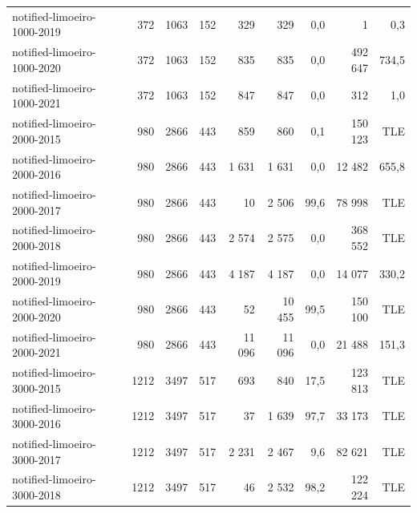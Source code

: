 \documentclass[a4paper,11pt]{article}
\begin{document}
\begin{table}[!ht]
{\begin{tabular}{lrrrrrrrr}
notified-limoeiro-1000-2019   & 372  & 1063 & 152 & 329    & 329    & 0,0  & 1       & 0,3                         \\
\rowcolor[HTML]{9B9B9B} 
notified-limoeiro-1000-2020   & 372  & 1063 & 152 & 835    & 835    & 0,0  & 492 647 & 734,5                       \\
\rowcolor[HTML]{9B9B9B} 
notified-limoeiro-1000-2021   & 372  & 1063 & 152 & 847    & 847    & 0,0  & 312     & 1,0                         \\ \hline
\rowcolor[HTML]{C0C0C0} 
notified-limoeiro-2000-2015   & 980  & 2866 & 443 & 859    & 860    & 0,1  & 150 123 & TLE                         \\
\rowcolor[HTML]{9B9B9B} 
notified-limoeiro-2000-2016   & 980  & 2866 & 443 & 1 631  & 1 631  & 0,0  & 12 482  & 655,8                       \\
\rowcolor[HTML]{C0C0C0} 
notified-limoeiro-2000-2017   & 980  & 2866 & 443 & 10     & 2 506  & 99,6 & 78 998  & \cellcolor[HTML]{C0C0C0}TLE \\
\rowcolor[HTML]{C0C0C0} 
notified-limoeiro-2000-2018   & 980  & 2866 & 443 & 2 574  & 2 575  & 0,0  & 368 552 & TLE                         \\
\rowcolor[HTML]{9B9B9B} 
notified-limoeiro-2000-2019   & 980  & 2866 & 443 & 4 187  & 4 187  & 0,0  & 14 077  & 330,2                       \\
\rowcolor[HTML]{C0C0C0} 
notified-limoeiro-2000-2020   & 980  & 2866 & 443 & 52     & 10 455 & 99,5 & 150 100 & \cellcolor[HTML]{C0C0C0}TLE \\
\rowcolor[HTML]{9B9B9B} 
{\color[HTML]{333333} notified-limoeiro-2000-2021} &
  {\color[HTML]{333333} 980} &
  {\color[HTML]{333333} 2866} &
  {\color[HTML]{333333} 443} &
  {\color[HTML]{333333} 11 096} &
  {\color[HTML]{333333} 11 096} &
  {\color[HTML]{333333} 0,0} &
  {\color[HTML]{333333} 21 488} &
  {\color[HTML]{333333} 151,3} \\ \hline
\rowcolor[HTML]{C0C0C0} 
notified-limoeiro-3000-2015   & 1212 & 3497 & 517 & 693    & 840    & 17,5 & 123 813 & \cellcolor[HTML]{C0C0C0}TLE \\
\rowcolor[HTML]{C0C0C0} 
notified-limoeiro-3000-2016   & 1212 & 3497 & 517 & 37     & 1 639  & 97,7 & 33 173  & \cellcolor[HTML]{C0C0C0}TLE \\
\rowcolor[HTML]{C0C0C0} 
notified-limoeiro-3000-2017   & 1212 & 3497 & 517 & 2 231  & 2 467  & 9,6  & 82 621  & \cellcolor[HTML]{C0C0C0}TLE \\
\rowcolor[HTML]{C0C0C0} 
notified-limoeiro-3000-2018   & 1212 & 3497 & 517 & 46     & 2 532  & 98,2 & 122 224 & \cellcolor[HTML]{C0C0C0}TLE \\

\end{tabular}}
\end{table}
\end{document}
